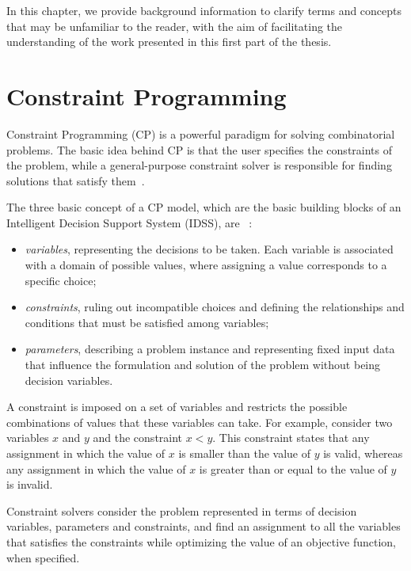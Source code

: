 \label{chap:pt1_background}

In this chapter, we provide background information to clarify terms and concepts that may be unfamiliar to the reader, with the aim of facilitating the understanding of the work presented in this first part of the thesis.

\section{Constraint Programming}
Constraint Programming (CP) is a powerful paradigm for solving combinatorial problems. The basic idea behind CP is that the user specifies the constraints of the problem, while a general-purpose constraint solver is responsible for finding solutions that satisfy them~\cite{rossi2008constraint}.

The three basic concept of a CP model, which are the basic building blocks of an Intelligent Decision Support System (IDSS), are ~\cite{wallace2020building}:
\begin{itemize}
	\item \textit{variables}, representing the decisions to be taken. Each variable is associated with a domain of possible values, where assigning a value corresponds to a specific choice;
	
	\item \textit{constraints}, ruling out incompatible choices and defining the relationships and conditions that must be satisfied among variables;
	
	\item \textit{parameters}, describing a problem instance and representing fixed input data that influence the formulation and solution of the problem without being decision variables.
\end{itemize}

A constraint is imposed on a set of variables and restricts the possible combinations of values that these variables can take. For example, consider two variables $x$ and $y$ and the constraint $x < y$. This constraint states that any assignment in which the value of $x$ is smaller than the value of $y$ is valid, whereas any assignment in which the value of $x$ is greater than or equal to the value of $y$ is invalid.

Constraint solvers consider the problem  represented in terms of decision variables, parameters and constraints, and find an assignment to all the variables that satisfies the constraints while optimizing the value of an objective function, when specified.

